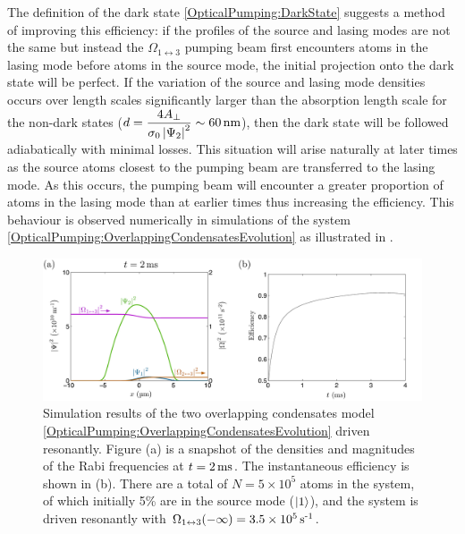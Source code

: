 The definition of the dark state \eqref{OpticalPumping:DarkState} suggests a method of improving this efficiency: if the profiles of the source and lasing modes are not the same but instead the $\Omega_{1\leftrightarrow 3}$ pumping beam first encounters atoms in the lasing mode before atoms in the source mode, the initial projection onto the dark state will be perfect.  If the variation of the source and lasing mode densities occurs over length scales significantly larger than the absorption length scale for the non-dark states ($\displaystyle d = \frac{4 A_\perp}{\sigma_0 \abs{\Psi_2}^2} \sim \unit[60]{nm}$), then the dark state will be followed adiabatically with minimal losses.  This situation will arise naturally at later times as the source atoms closest to the pumping beam are transferred to the lasing mode.  As this occurs, the pumping beam will encounter a greater proportion of atoms in the lasing mode than at earlier times thus increasing the efficiency.  This behaviour is observed numerically in simulations of the system \eqref{OpticalPumping:OverlappingCondensatesEvolution} as illustrated in .

\begin{figure}
    \centering
    \includegraphics[width=15cm]{OverlappingCondensatesZeroDetuning}
    \caption{Simulation results of the two overlapping condensates model \eqref{OpticalPumping:OverlappingCondensatesEvolution} driven resonantly.  Figure (a) is a snapshot of the densities and magnitudes of the Rabi frequencies at $t = \unit[2]{ms}$.  The instantaneous efficiency is shown in (b).  There are a total of $N = 5 \times 10^5$ atoms in the system, of which initially 5\% are in the source mode (${\left|1\right>}$), and the system is driven resonantly with $\Omega_{1\leftrightarrow 3}(-\infty) = 3.5 \times \unit[10^5]{s\textsuperscript{-1}}$.}
    \label{OpticalPumping:OverlappingCondensatesZeroDetuning}
\end{figure}


